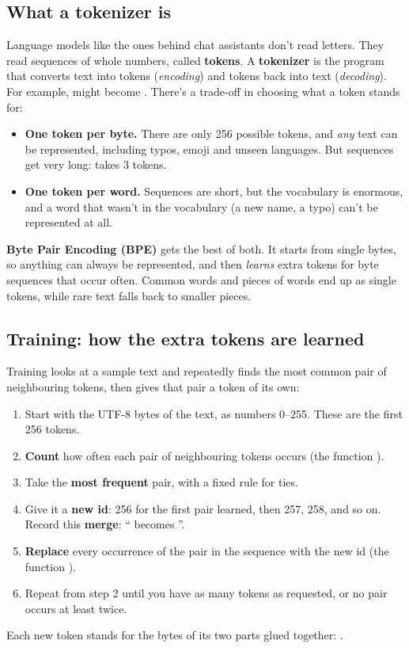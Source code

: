 \documentclass[10pt,a4paper]{article}
\begin{document}
\subsection{What a tokenizer is}
Language models like the ones behind chat assistants don’t read letters. They read sequences of whole numbers, called \textbf{tokens}. A \textbf{tokenizer} is the program that converts text into tokens (\emph{encoding}) and tokens back into text (\emph{decoding}). For example,  might become \code{[31373,\allowbreak{}\ 995]}.
There’s a trade-off in choosing what a token stands for:
\begin{itemize}
\item \textbf{One token per byte.} There are only 256 possible tokens, and \emph{any} text can be represented, including typos, emoji and unseen languages. But sequences get very long:  takes 3 tokens.
\item \textbf{One token per word.} Sequences are short, but the vocabulary is enormous, and a word that wasn’t in the vocabulary (a new name, a typo) can’t be represented at all.
\end{itemize}
\textbf{Byte Pair Encoding (BPE)} gets the best of both. It starts from single bytes, so anything can always be represented, and then \emph{learns} extra tokens for byte sequences that occur often. Common words and pieces of words end up as single tokens, while rare text falls back to smaller pieces.
\subsection{Training: how the extra tokens are learned}
Training looks at a sample text and repeatedly finds the most common pair of neighbouring tokens, then gives that pair a token of its own:
\begin{enumerate}
\item Start with the UTF-8 bytes of the text, as numbers 0–255. These are the first 256 tokens.
\item \textbf{Count} how often each pair of neighbouring tokens occurs (the function ).
\item Take the \textbf{most frequent} pair, with a fixed rule for ties.
\item Give it a \textbf{new id}: 256 for the first pair learned, then 257, 258, and so on. Record this \textbf{merge}: “ becomes ”.
\item \textbf{Replace} every occurrence of the pair in the sequence with the new id (the function ).
\item Repeat from step 2 until you have as many tokens as requested, or no pair occurs at least twice.
\end{enumerate}
Each new token stands for the bytes of its two parts glued together: .
\end{document}
